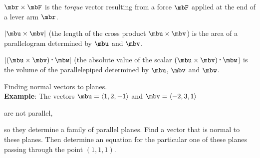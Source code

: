 \documentclass[12pt,fleqn]{article}
\def\eg#1{{\bf Example}: #1}
\def\vdotprod{\,\mbox{{\Large $\cdot$}}\,}
\def\vcrossprod{\times}
\begin{document}
\bi
\item
  $\mbr\vcrossprod\mbF$ is the {\em torque} vector resulting
  from a force $\mbF$ applied at the end of a lever arm $\mbr$.
\item
  $|\mbu\vcrossprod\mbv|$ (the length of the cross product
  $\mbu\vcrossprod\mbv$) is the area of a parallelogram
  determined by $\mbu$ and $\mbv$.
\item
  $|(\mbu\vcrossprod\mbv)\vdotprod\mbw|$ (the absolute value
  of the scalar $(\mbu\vcrossprod\mbv)\vdotprod\mbw$) is the
  volume of the parallelepiped determined by $\mbu$, $\mbv$
  and $\mbw$.
\item
  Finding normal vectors to planes. \\[14pt]
  \eg{}
  The vectors $\mbu = \left<1, 2, -1\right>$ and
  $\mbv = \left<-2,3,1\right>$
  \bi
  \item are not parallel,
  \item so they determine a family of parallel planes.
  \ei
  Find a vector that is normal to these planes.  Then determine
  an equation for the particular one of these planes passing
  through the point $(1,1,1)$.
\ei
\end{document}
